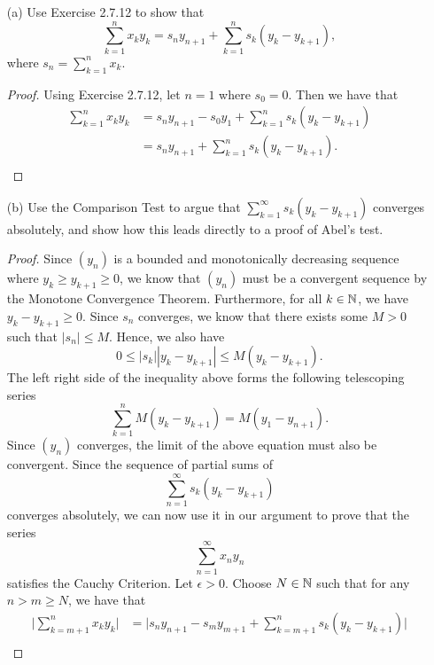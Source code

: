 \begin{enumerate}
    \item[(a)] Use Exercise 2.7.12 to show that 
        \[  \sum_{ k=1  }^{ n  } x_k y_k = s_n y_{n+1} + \sum_{ k=1  }^{ n } s_k (y_k - y_{k+1} ), \] where \( s_n = \sum_{ k=1  }^{ n } x_k  \).
        \begin{proof}
        Using Exercise 2.7.12, let \( n = 1  \) where \( s_0 = 0  \). Then we have that 
        \begin{align*}
            \sum_{ k=1 }^{ n } x_k y_k &= s_n y_{n+1} - s_0 y_1 + \sum_{ k=1  }^{ n  } s_k (y_k - y_{k+1} ) \\
                                       &= s_n y_{n+1} + \sum_{ k=1  }^{ n  } s_k (y_k - y_{k+1}).\\
        \end{align*}
        \end{proof}
    \item[(b)] Use the Comparison Test to argue that \( \sum_{ k=1  }^{ \infty  } s_k (y_k - y_{k+1}) \) converges absolutely, and show how this leads directly to a proof of Abel's test.
        \begin{proof}
            Since \( (y_n)  \) is a bounded and monotonically decreasing sequence where \(  y_k \geq y_{k+1} \geq 0  \), we know that \( (y_n)  \) must be a convergent sequence by the Monotone Convergence Theorem. Furthermore, for all \(  k \in \mathbb{N}  \), we have \( y_k - y_{k+1} \geq 0  \). Since \( s_n  \) converges, we know that there exists some \( M > 0  \) such that \( | s_n  | \leq M  \). Hence, we also have
            \[  0 \leq | s_k | | y_k - y_{k+1} | \leq M (y_k - y_{k+1} ).\]
            The left right side of the inequality above forms the following telescoping series 
            \[  \sum_{ k=1  }^{ n  } M (y_k - y_{k+1 } ) = M (y_1 - y_{n+1}). \]
            Since \( (y_n)  \) converges, the limit of the above equation must also be convergent. Since the sequence of partial sums of 
            \[  \sum_{ n=1  }^{ \infty  } s_k (y_k - y_{k+1} ) \] converges absolutely, we can now use it in our argument to prove that the series  
            \[  \sum_{ n=1  }^{ \infty  } x_n y_n \tag{1}  \]
            satisfies the Cauchy Criterion. Let \( \epsilon > 0   \). Choose \( N \in \mathbb{N}  \) such that for any \(  n > m \geq N  \), we have that 
            \begin{align*}
                \Big| \sum_{ k= m + 1  }^{ n } x_k y_k  \Big| &= \Big| s_n y_{n+1}  - s_m y_{m+1} + \sum_{ k= m + 1  }^{ n  } s_k (y_k - y_{k+1} ) \Big|  \\

\end{align*}
\end{proof}
\end{enumerate}
